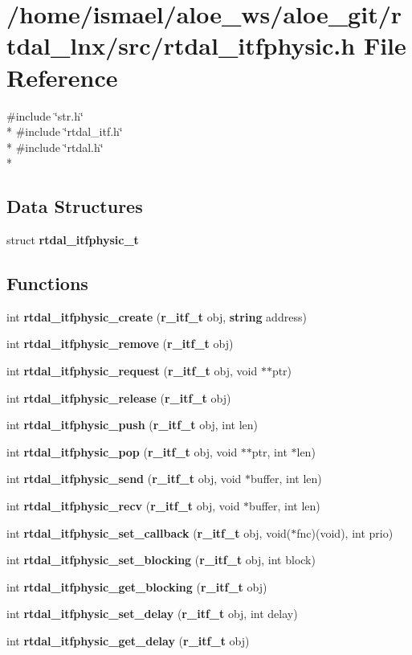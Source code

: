 \section{/home/ismael/aloe\-\_\-ws/aloe\-\_\-git/rtdal\-\_\-lnx/src/rtdal\-\_\-itfphysic.h File Reference}
\label{rtdal__itfphysic_8h}
{\ttfamily \#include \char`\"{}str.\-h\char`\"{}}\\*
{\ttfamily \#include \char`\"{}rtdal\-\_\-itf.\-h\char`\"{}}\\*
{\ttfamily \#include \char`\"{}rtdal.\-h\char`\"{}}\\*
\subsection*{Data Structures}
\begin{DoxyCompactItemize}
\item 
struct {\bf rtdal\-\_\-itfphysic\-\_\-t}
\end{DoxyCompactItemize}
\subsection*{Functions}
\begin{DoxyCompactItemize}
\item 
int {\bf rtdal\-\_\-itfphysic\-\_\-create} ({\bf r\-\_\-itf\-\_\-t} obj, {\bf string} address)
\item 
int {\bf rtdal\-\_\-itfphysic\-\_\-remove} ({\bf r\-\_\-itf\-\_\-t} obj)
\item 
int {\bf rtdal\-\_\-itfphysic\-\_\-request} ({\bf r\-\_\-itf\-\_\-t} obj, void $\ast$$\ast$ptr)
\item 
int {\bf rtdal\-\_\-itfphysic\-\_\-release} ({\bf r\-\_\-itf\-\_\-t} obj)
\item 
int {\bf rtdal\-\_\-itfphysic\-\_\-push} ({\bf r\-\_\-itf\-\_\-t} obj, int len)
\item 
int {\bf rtdal\-\_\-itfphysic\-\_\-pop} ({\bf r\-\_\-itf\-\_\-t} obj, void $\ast$$\ast$ptr, int $\ast$len)
\item 
int {\bf rtdal\-\_\-itfphysic\-\_\-send} ({\bf r\-\_\-itf\-\_\-t} obj, void $\ast$buffer, int len)
\item 
int {\bf rtdal\-\_\-itfphysic\-\_\-recv} ({\bf r\-\_\-itf\-\_\-t} obj, void $\ast$buffer, int len)
\item 
int {\bf rtdal\-\_\-itfphysic\-\_\-set\-\_\-callback} ({\bf r\-\_\-itf\-\_\-t} obj, void($\ast$fnc)(void), int prio)
\item 
int {\bf rtdal\-\_\-itfphysic\-\_\-set\-\_\-blocking} ({\bf r\-\_\-itf\-\_\-t} obj, int block)
\item 
int {\bf rtdal\-\_\-itfphysic\-\_\-get\-\_\-blocking} ({\bf r\-\_\-itf\-\_\-t} obj)
\item 
int {\bf rtdal\-\_\-itfphysic\-\_\-set\-\_\-delay} ({\bf r\-\_\-itf\-\_\-t} obj, int delay)
\item 
int {\bf rtdal\-\_\-itfphysic\-\_\-get\-\_\-delay} ({\bf r\-\_\-itf\-\_\-t} obj)
\end{DoxyCompactItemize}


